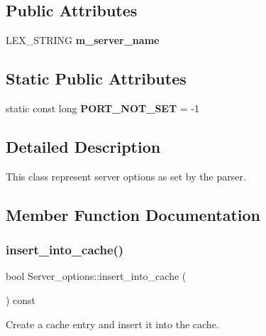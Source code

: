 \subsection*{Public Attributes}
\begin{DoxyCompactItemize}
\item 
\mbox{\label{classServer__options_aaeddad4d88665cafc3a7cfe434b34bb0}} 
L\+E\+X\+\_\+\+S\+T\+R\+I\+NG {\bfseries m\+\_\+server\+\_\+name}
\end{DoxyCompactItemize}
\subsection*{Static Public Attributes}
\begin{DoxyCompactItemize}
\item 
\mbox{\label{classServer__options_a238a4d6012b91de50339d91fa686ca70}} 
static const long {\bfseries P\+O\+R\+T\+\_\+\+N\+O\+T\+\_\+\+S\+ET} = -\/1
\end{DoxyCompactItemize}


\subsection{Detailed Description}
This class represent server options as set by the parser. 

\subsection{Member Function Documentation}
\mbox{\label{classServer__options_aa38756deb4d8d21803d955a961b7cdd7}} 
\subsubsection{\texorpdfstring{insert\+\_\+into\+\_\+cache()}{insert\_into\_cache()}}
{\footnotesize\ttfamily bool Server\+\_\+options\+::insert\+\_\+into\+\_\+cache (\begin{DoxyParamCaption}{ }\end{DoxyParamCaption}) const}

Create a cache entry and insert it into the cache.

